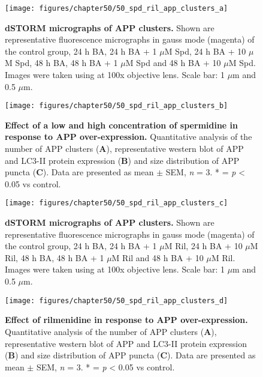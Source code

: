 \begin{landscape}
\begin{figure}[!htbp]
\center
  \texttt{[image: figures/chapter50/50\_spd\_ril\_app\_clusters\_a]}
  \caption[dSTORM micrographs of APP clusters]{\textbf{dSTORM micrographs of APP clusters.} Shown are representative fluorescence micrographs in gauss mode (magenta) of the control group, 24 h BA, 24 h BA + 1 $\mu$M Spd, 24 h BA + 10 $\mu$M Spd, 48 h BA, 48 h BA + 1 $\mu$M Spd and 48 h BA + 10 $\mu$M Spd. Images were taken using at 100x objective lens. Scale bar: 1 $\mu$m and 0.5 $\mu$m.}
  \label{fig:50_spd_ril_app_clusters_a}
\end{figure} 
\end{landscape}

\begin{landscape}
\begin{figure}[!htbp]
\center
  \texttt{[image: figures/chapter50/50\_spd\_ril\_app\_clusters\_b]}
  \caption[The effect of a low and a high concentration of spermidine in response to APP over-expression]{\textbf{Effect of a low and high concentration of spermidine in response to APP over-expression.} Quantitative analysis of the number of APP clusters (\textbf{A}), representative western blot of APP and LC3-II protein expression (\textbf{B}) and size distribution of APP puncta (\textbf{C}). Data are presented as mean $\pm$ SEM, \textit{n} = 3. * = \textit{p} < 0.05 vs control.}
  \label{fig:50_spd_ril_app_clusters_b}
\end{figure} 
\end{landscape}

\begin{landscape}
\begin{figure}[!htbp]
\center
  \texttt{[image: figures/chapter50/50\_spd\_ril\_app\_clusters\_c]}
  \caption[dSTORM micrographs of APP clusters]{\textbf{dSTORM micrographs of APP clusters.} Shown are representative fluorescence micrographs in gauss mode (magenta) of the control group, 24 h BA, 24 h BA + 1 $\mu$M Ril, 24 h BA + 10 $\mu$M Ril, 48 h BA, 48 h BA + 1 $\mu$M Ril and 48 h BA + 10 $\mu$M Ril. Images were taken using at 100x objective lens. Scale bar: 1 $\mu$m and 0.5 $\mu$m.}
  \label{fig:50_spd_ril_app_clusters_c}
\end{figure} 
\end{landscape}

\begin{landscape}
\begin{figure}[!htbp]
\center
  \texttt{[image: figures/chapter50/50\_spd\_ril\_app\_clusters\_d]}
  \caption[The effect of a low and a high concentration of rilmenidine in response to APP over-expression]{\textbf{Effect of rilmenidine in response to APP over-expression.} Quantitative analysis of the number of APP clusters (\textbf{A}), representative western blot of APP and LC3-II protein expression (\textbf{B}) and size distribution of APP puncta (\textbf{C}). Data are presented as mean $\pm$ SEM, \textit{n} = 3. * = \textit{p} < 0.05 vs control.}
  \label{fig:50_spd_ril_app_clusters_d}
\end{figure} 
\end{landscape}

